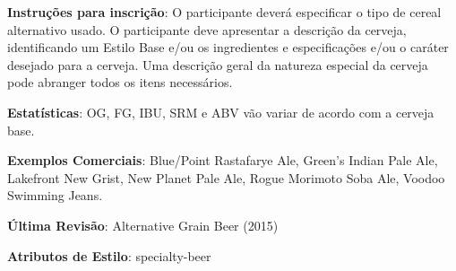 \textbf{Instruções para inscrição}: O participante deverá especificar o tipo de cereal alternativo usado. O participante deve apresentar a descrição da cerveja, identificando um Estilo Base e/ou os ingredientes e especificações e/ou o caráter desejado para a cerveja. Uma descrição geral da natureza especial da cerveja pode abranger todos os itens necessários.

\textbf{Estatísticas}: OG, FG, IBU, SRM e ABV vão variar de acordo com a cerveja base.

\textbf{Exemplos Comerciais}: Blue/Point Rastafarye Ale, Green’s Indian Pale Ale, Lakefront New Grist, New Planet Pale Ale, Rogue Morimoto Soba Ale, Voodoo Swimming Jeans.

\textbf{Última Revisão}: Alternative Grain Beer (2015)

\textbf{Atributos de Estilo}: specialty-beer
